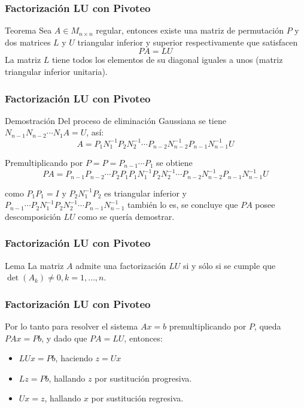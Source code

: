 \documentclass{beamer}
\begin{document}
\begin{frame}
  \frametitle{Factorizaci\'on LU con Pivoteo}
  \begin{block}{Teorema}
    Sea $A \in M_{n\times n}$ regular, entonces existe una matriz de permutación $P$ y dos matrices $L$ y $U$ triangular inferior y superior respectivamente que satisfacen
    $$
      PA = LU
    $$
    La matriz $L$ tiene todos los elementos de su diagonal iguales a unos (matriz triangular inferior unitaria).
  \end{block}
\end{frame}
\begin{frame}
  \frametitle{Factorizaci\'on LU con Pivoteo}
  \begin{block}{Demostraci\'on}
    Del proceso de eliminaci\'on Gaussiana se tiene $N_{n-1}N_{n-2}\cdots N_1 A = U$, as\'i:  
    $$
      A = P_1N_1^{-1}P_2 N_2^{-1} \cdots P_{n-2} N_{n-2}^{-1} P_{n-1} N_{n-1}^{-1}U
    $$
  
    Premultiplicando por $P=P = P_{n-1}\cdots P_1$ se obtiene  
    $$
      PA = P_{n-1}P_{n-2}\cdots P_2P_1P_1N_1^{-1}P_2 N_2^{-1} \cdots P_{n-2} N_{n-2}^{-1} P_{n-1} N_{n-1}^{-1}U
    $$
  
    como $P_1P_1=I$ y $P_2N_1^{-1}P_2$ es triangular inferior y $P_{n-1}\cdots P_2 N_1^{-1} P_2 N_2^{-1}\cdots  P_{n-1}N_{n-1}^{-1}$ tambi\'en lo es, se concluye que $PA$ posee descomposici\'on $LU$ como se quer\'ia demostrar.
  \end{block}
\end{frame}
\begin{frame}
  \frametitle{Factorizaci\'on LU con Pivoteo}
  \begin{block}{Lema}
    La matriz $A$ admite una factorizaci\'on $LU$ si y s\'olo si se cumple que $\det(A_k) \neq 0, k = 1,\ldots, n$.
  \end{block}
  

\end{frame}
\begin{frame}
  \frametitle{Factorizaci\'on LU con Pivoteo}
  Por lo tanto para resolver el sistema $Ax=b$ premultiplicando por $P$, queda $PAx=Pb$, y dado que $PA=LU$, entonces:
  \begin{itemize}
    \item<2-> $LUx=Pb$, haciendo $z=Ux$
    \item<3-> $Lz=Pb$, hallando $z$ por sustituci\'on progresiva.
    \item<4-> $Ux=z$, hallando $x$ por sustituci\'on regresiva.
  \end{itemize}
\end{frame}
\end{document}
